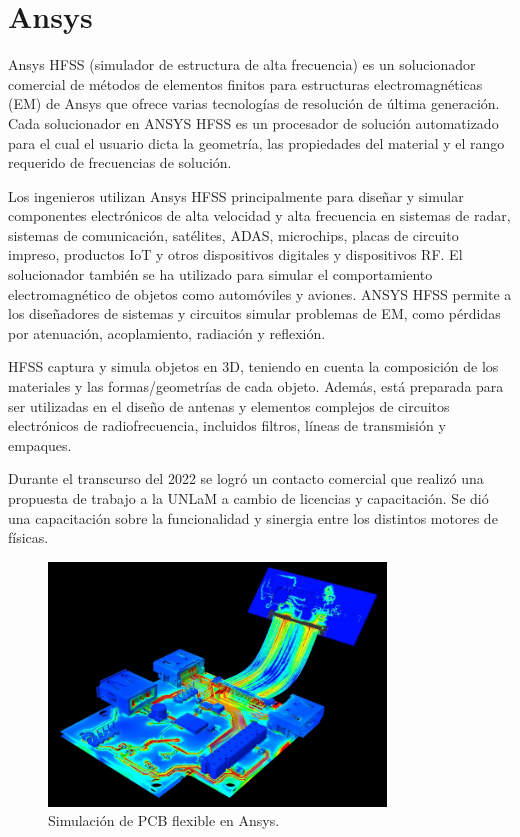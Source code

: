 \documentclass[
    11pt,
    spanish,
    a4paper
]{article}
\begin{document}
\newpage


\section{Ansys}

Ansys HFSS (simulador de estructura de alta frecuencia) es un solucionador comercial de métodos de elementos finitos para estructuras electromagnéticas (EM) de Ansys que ofrece varias tecnologías de resolución de última generación.
Cada solucionador en ANSYS HFSS es un procesador de solución automatizado para el cual el usuario dicta la geometría, las propiedades del material y el rango requerido de frecuencias de solución.

Los ingenieros utilizan Ansys HFSS principalmente para diseñar y simular componentes electrónicos de alta velocidad y alta frecuencia en sistemas de radar, sistemas de comunicación, satélites, ADAS, microchips, placas de circuito impreso, productos IoT y otros dispositivos digitales y dispositivos RF.
El solucionador también se ha utilizado para simular el comportamiento electromagnético de objetos como automóviles y aviones.
ANSYS HFSS permite a los diseñadores de sistemas y circuitos simular problemas de EM, como pérdidas por atenuación, acoplamiento, radiación y reflexión.

HFSS captura y simula objetos en 3D, teniendo en cuenta la composición de los materiales y las formas/geometrías de cada objeto.
Además, está preparada para ser utilizadas en el diseño de antenas y elementos complejos de circuitos electrónicos de radiofrecuencia, incluidos filtros, líneas de transmisión y empaques.

Durante el transcurso del 2022 se logró un contacto comercial que realizó una propuesta de trabajo a la UNLaM a cambio de licencias y capacitación.
Se dió una capacitación sobre la funcionalidad y sinergia entre los distintos motores de físicas.

\begin{figure}[htbp]
	\centering
	\includegraphics[width=0.8\textwidth]{img/ansys.jpg}
	\caption{Simulación de PCB flexible en Ansys.}
	\label{fig:ansys}
\end{figure}
\end{document}
